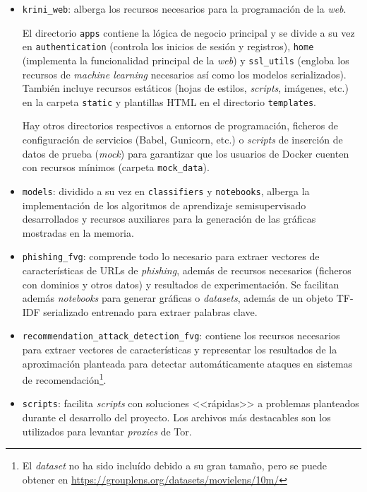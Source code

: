 \begin{itemize}
	\item \texttt{krini\_web}: alberga los recursos necesarios para la programación de la \textit{web}. 
	
	El directorio \texttt{apps} contiene la lógica de negocio principal y se divide a su vez en \texttt{authentication} (controla los inicios de sesión y registros), \texttt{home} (implementa la funcionalidad principal de la \textit{web}) y \texttt{ssl\_utils} (engloba los recursos de \textit{machine learning} necesarios así como los modelos serializados). También incluye recursos estáticos (hojas de estilos, \textit{scripts}, imágenes, etc.) en la carpeta \texttt{static} y plantillas HTML en el directorio \texttt{templates}.
	
	Hay otros directorios respectivos a entornos de programación, ficheros de configuración de servicios (Babel, Gunicorn, etc.) o \textit{scripts} de inserción de datos de prueba (\textit{mock}) para garantizar que los usuarios de Docker cuenten con recursos mínimos (carpeta \texttt{mock\_data}).
	
	\item \texttt{models}: dividido a su vez en \texttt{classifiers} y \texttt{notebooks}, alberga la implementación de los algoritmos de aprendizaje semisupervisado desarrollados y recursos auxiliares para la generación de las gráficas mostradas en la memoria.
	
	\item \texttt{phishing\_fvg}: comprende todo lo necesario para extraer vectores de características de URLs de \textit{phishing}, además de recursos necesarios (ficheros con dominios y otros datos) y resultados de experimentación. Se facilitan además \textit{notebooks} para generar gráficas o \textit{datasets}, además de un objeto TF-IDF serializado entrenado para extraer palabras clave.
	
	\item \texttt{recommendation\_attack\_detection\_fvg}: contiene los recursos necesarios para extraer vectores de características y representar los resultados de la aproximación planteada para detectar automáticamente ataques en sistemas de recomendación\footnote{El \textit{dataset} no ha sido incluído debido a su gran tamaño, pero se puede obtener en \url{https://grouplens.org/datasets/movielens/10m/}}.
	
	\item \texttt{scripts}: facilita \textit{scripts} con soluciones <<rápidas>> a problemas planteados durante el desarrollo del proyecto. Los archivos más destacables son los utilizados para levantar \textit{proxies} de Tor.


\end{itemize}
